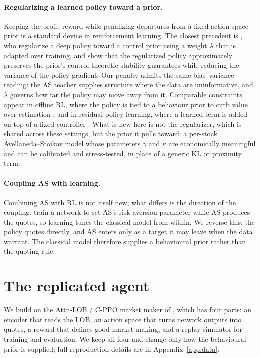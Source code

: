 \documentclass{article}
\newcommand{\cppo}{\textsc{C-PPO}}
\begin{document}
\paragraph{Regularizing a learned policy toward a prior.}
Keeping the profit reward while penalizing departures from a fixed action-space prior is a standard device in reinforcement learning. The closest precedent is \citet{cheng2019control}, who regularize a deep policy toward a control prior using a weight $\lambda$ that is adapted over training, and show that the regularized policy approximately preserves the prior's control-theoretic stability guarantees while reducing the variance of the policy gradient. Our penalty admits the same bias--variance reading: the AS teacher supplies structure where the data are uninformative, and $\lambda$ governs how far the policy may move away from it. Comparable constraints appear in offline RL, where the policy is tied to a behaviour prior to curb value over-estimation \citep{fujimoto2019bcq}, and in residual policy learning, where a learned term is added on top of a fixed controller \citep{silver2018residual}. What is new here is not the regularizer, which is shared across these settings, but the prior it pulls toward: a per-stock Avellaneda--Stoikov model whose parameters $\gamma$ and $\kappa$ are economically meaningful and can be calibrated and stress-tested, in place of a generic KL or proximity term.

\paragraph{Coupling AS with learning.}
Combining AS with RL is not itself new; what differs is the direction of the coupling. \citet{falcesmarin2022} train a network to set AS's risk-aversion parameter while AS produces the quotes, so learning tunes the classical model from within. We reverse this: the policy quotes directly, and AS enters only as a target it may leave when the data warrant. The classical model therefore supplies a behavioural prior rather than the quoting rule.


\section{The replicated agent}
\label{sec:replicated}


We build on the Attn-LOB / \cppo{} market maker of \citet{guo2023mm}, which has four parts: an encoder that reads the LOB, an action space that turns network outputs into quotes, a reward that defines good market making, and a replay simulator for training and evaluation. We keep all four and change only how the behavioural prior is supplied; full reproduction details are in Appendix~\ref{app:data}.
\end{document}
